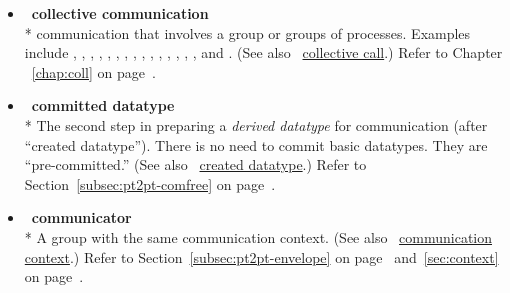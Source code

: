 \begin{itemize}
\label{glossary:collective communication}
\item  ~\hypertarget{glossary:collective_communication}{\textbf{collective communication}} \\*
communication that involves a group
or groups of processes. Examples include , ,
, , , ,
, , , ,
, , , ,
, and .
(See also ~\hyperlink{glossary:collective_call}{collective call}.)
Refer to Chapter ~\ref{chap:coll} on page~\pageref{chap:coll}.

\label{glossary:committed_datatype}
\item  ~\hypertarget{glossary:committed_datatype}{\textbf{committed datatype}} \\*
The second step in preparing a \emph{derived datatype} for communication (after ``created datatype'').
There is no need to commit basic datatypes. They are ``pre-committed.''
(See also ~\hyperlink{glossary:created_datatype}{created datatype}.)
Refer to Section~\ref{subsec:pt2pt-comfree} on page~\pageref{subsec:pt2pt-comfree}.

\label{glossary:communicator}
\item  ~\hypertarget{glossary:communicator}{\textbf{communicator}} \\*
A group with the same communication context.
(See also ~\hyperlink{glossary:communication_context}{communication context}.)
 Refer to Section~\ref{subsec:pt2pt-envelope} on page~\pageref{subsec:pt2pt-envelope} and~\ref{sec:context} on page~\pageref{sec:context}.


\end{itemize}
